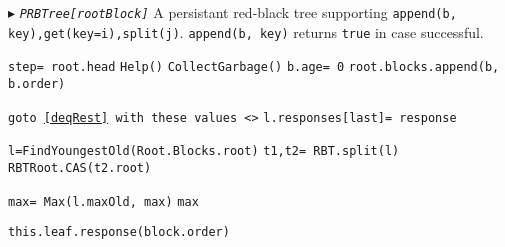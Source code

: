 \documentclass[10pt]{article}
\theoremstyle{definition}
\begin{document}
\begin{algorithm}
\begin{algorithmic}[1]
\begin{multicols}{2}

\Statex $\blacktriangleright$ \texttt{\textsl{PRBTree[rootBlock]}}
  \Statex \textsf{A persistant red-black tree supporting \texttt{append(b, key),get(key=i),split(j)}}. \texttt{append(b, key)} returns \texttt{true} in case successful.






 
\State \texttt{step= root.head}
\State \texttt{Help()}
\State \texttt{CollectGarbage()}
\EndIf
\State \texttt{b.age= 0}
\State \Return \texttt{root.blocks.append(b, b.order)}
\Statex


 
\State \texttt{goto \ref{deqRest} with these values <>} 
\State \texttt{l.responses[last]= response}
\EndIf
\EndIf
\EndFor
{}
\Statex

\State \texttt{l=FindYoungestOld(Root.Blocks.root)}
\State \texttt{t1,t2= RBT.split(l)}
\State \texttt{RBTRoot.CAS(t2.root)}

\Statex

\State\texttt{max= Max(l.maxOld, max)}
\EndFor
\State\Return\texttt{max} 

\Statex



\State \Return \texttt{this.leaf.response(block.order)}
\EndIf


\end{multicols}
\end{algorithmic}
\end{algorithm}
\end{document}
